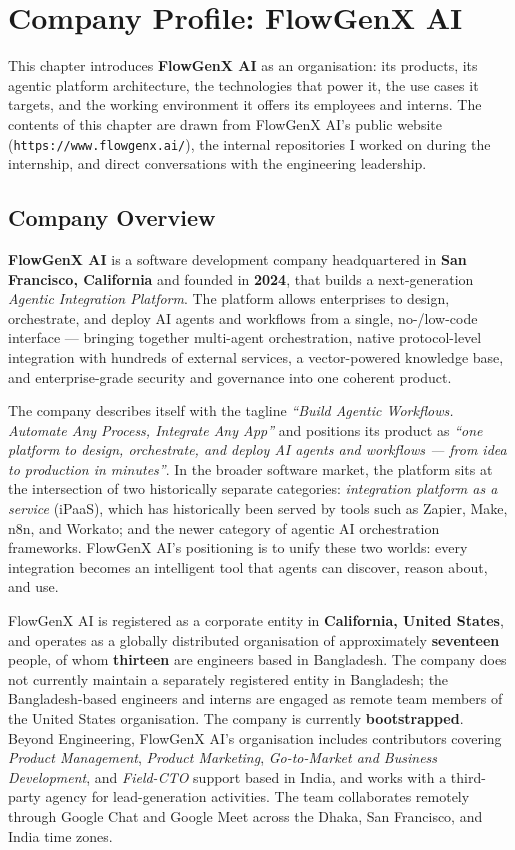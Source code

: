 \chapter{Company Profile: FlowGenX AI}
\label{ch:company}

This chapter introduces \textbf{FlowGenX AI} as an organisation:
its products, its agentic platform architecture, the technologies
that power it, the use cases it targets, and the working environment
it offers its employees and interns. The contents of this chapter
are drawn from FlowGenX AI's public website
(\texttt{https://www.flowgenx.ai/}), the internal repositories I
worked on during the internship, and direct conversations with the
engineering leadership.

\section{Company Overview}
\textbf{FlowGenX AI} is a software development company headquartered
in \textbf{San Francisco, California} and founded in \textbf{2024},
that builds a next-generation \emph{Agentic Integration Platform}.
The platform allows enterprises to design, orchestrate, and deploy AI
agents and workflows from a single, no-/low-code interface ---
bringing together multi-agent orchestration, native protocol-level
integration with hundreds of external services, a vector-powered
knowledge base, and enterprise-grade security and governance into one
coherent product.

The company describes itself with the tagline
\emph{``Build Agentic Workflows. Automate Any Process, Integrate Any
App''} and positions its product as
\emph{``one platform to design, orchestrate, and deploy AI agents and
workflows --- from idea to production in minutes''}. In the broader
software market, the platform sits at the intersection of two
historically separate categories: \emph{integration platform as a
service} (iPaaS), which has historically been served by tools such as
Zapier, Make, n8n, and Workato; and the newer category of agentic AI
orchestration frameworks. FlowGenX AI's positioning is to unify
these two worlds: every integration becomes an intelligent tool that
agents can discover, reason about, and use.

FlowGenX AI is registered as a corporate entity in
\textbf{California, United States}, and operates as a globally
distributed organisation of approximately \textbf{seventeen} people,
of whom \textbf{thirteen} are engineers based in Bangladesh. The
company does not currently maintain a separately registered entity
in Bangladesh; the Bangladesh-based engineers and interns are
engaged as remote team members of the United States organisation.
The company is currently \textbf{bootstrapped}. Beyond Engineering,
FlowGenX AI's organisation includes contributors covering
\emph{Product Management}, \emph{Product Marketing},
\emph{Go-to-Market and Business Development}, and \emph{Field-CTO}
support based in India, and works with a third-party agency for
lead-generation activities. The team collaborates remotely through
Google Chat and Google Meet across the Dhaka, San Francisco, and
India time zones.

